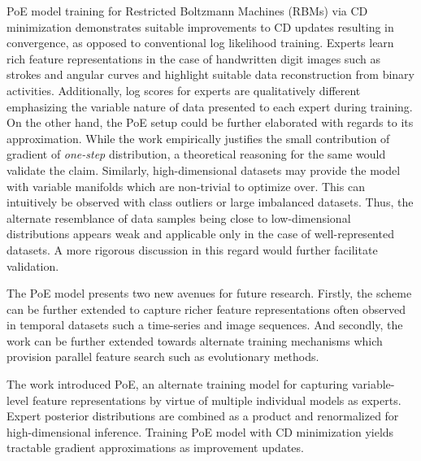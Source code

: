\documentclass[11pt,letterpaper]{article}
\begin{document}
PoE model training for Restricted Boltzmann Machines (RBMs) via CD minimization demonstrates suitable improvements to CD updates resulting in convergence, as opposed to conventional log likelihood training. Experts learn rich feature representations in the case of handwritten digit images such as strokes and angular curves and highlight suitable data reconstruction from binary activities. Additionally, log scores for experts are qualitatively different emphasizing the variable nature of data presented to each expert during training. On the other hand, the PoE setup could be further elaborated with regards to its approximation. While the work empirically justifies the small contribution of gradient of \textit{one-step} distribution, a theoretical reasoning for the same would validate the claim. Similarly, high-dimensional datasets may provide the model with variable manifolds which are non-trivial to optimize over. This can intuitively be observed with class outliers or large imbalanced datasets. Thus, the alternate resemblance of data samples being close to low-dimensional distributions appears weak and applicable only in the case of well-represented datasets. A more rigorous discussion in this regard would further facilitate validation. 

The PoE model presents two new avenues for future research. Firstly, the scheme can be further extended to capture richer feature representations often observed in temporal datasets such a time-series and image sequences. And secondly, the work can be further extended towards alternate training mechanisms which provision parallel feature search such as evolutionary methods. 

The work introduced PoE, an alternate training model for capturing variable-level feature representations by virtue of multiple individual models as experts. Expert posterior distributions are combined as a product and renormalized for high-dimensional inference. Training PoE model with CD minimization yields tractable gradient approximations as improvement updates.
\end{document}

